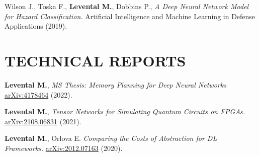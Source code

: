 \documentclass[11pt,letterpaper,roman,colorlinks,linkcolor=blue]{moderncv}
\newcommand*{\modern}{\fontfamily{qhv}\selectfont}
\newcommand{\mystyle}[1]{\textcolor{mygrey}{\modern #1}}
\newcommand{\mysectionstyle}[1]{\large\mystyle{#1}}
\begin{document}
\begin{hangingpar}
Wilson J., Toska F., \textbf{Levental M.}, Dobbins P.,
\textit{A Deep Neural Network Model for Hazard Classification.}
Artificial Intelligence and Machine Learning in Defense Applications (2019).
\end{hangingpar}

\section{\mysectionstyle{TECHNICAL REPORTS}}

\begin{hangingpar}
\textbf{Levental M.},
\textit{MS Thesis: Memory Planning for Deep Neural Networks} 
\href{https://arxiv.org/submit/4178464/view}{arXiv:4178464} (2022).
\end{hangingpar}

\begin{hangingpar}
\textbf{Levental M.},
\textit{Tensor Networks for Simulating Quantum Circuits on FPGAs.} 
\href{https://arxiv.org/abs/2108.06831}{arXiv:2108.06831} (2021).
\end{hangingpar}

\begin{hangingpar}
\textbf{Levental M.}, Orlova E.
\textit{Comparing the Costs of Abstraction for DL Frameworks.} 
\href{https://arxiv.org/abs/2012.07163}{arXiv:2012.07163} (2020).
\end{hangingpar}

%
%
%
\end{document}
